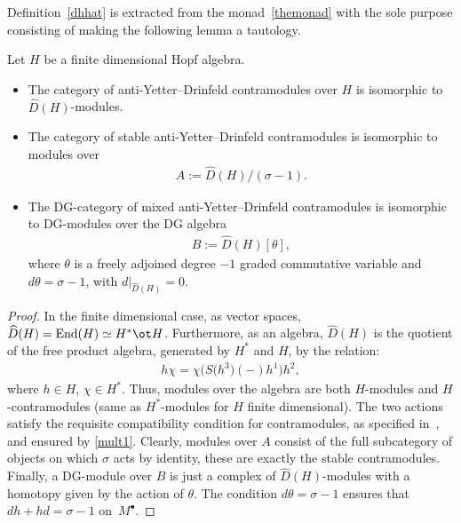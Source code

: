 Definition~\ref{dhhat} is extracted from the monad~\eqref{themonad} with the sole purpose consisting of making the following lemma a tautology.

\begin{Lemma}\label{bas}
Let $H$ be a finite dimensional Hopf algebra.
\begin{itemize}\itemsep=0pt
\item The category of anti-Yetter--Drinfeld contramodules over $H$ is isomorphic to $\widehat{D}(H)$-mo\-dules.

\item The category of stable anti-Yetter--Drinfeld contramodules is isomorphic to modules over
\begin{gather}
A:=\widehat{D}(H)/(\sigma-1).
\end{gather}

\item The DG-category of mixed anti-Yetter--Drinfeld contramodules is isomorphic to DG-mo\-dules over the DG algebra
\begin{gather}
B:=\widehat{D}(H)[\theta],
\end{gather}
where $\theta$ is a freely adjoined degree $-1$ graded commutative variable and $d\theta=\sigma-1$, with $d|_{\widehat{D}(H)}=0$.
\end{itemize}
\end{Lemma}
\begin{proof}
In the finite dimensional case, as vector spaces, $\widehat{D}(H)={\rm End}(H)\simeq H^*\ot H$. Furthermore, as an algebra, $\widehat{D}(H)$ is the quotient of the free product algebra, generated by $H^*$ and $H$, by the relation:
\begin{gather}
\label{mult1}
h \chi= \chi\big(S\big(h^3\big)(-)h^1\big)h^2,
\end{gather}
where $h\in H$, $\chi\in H^*$. Thus, modules over the algebra are both $H$-modules and $H$-cont\-ra\-mo\-du\-les (same as $H^*$-modules for $H$ finite dimensional). The two actions satisfy the requisite compatibility condition for contramodules, as specified in~\cite{contra}, and ensured by \eqref{mult1}. Clearly, modules over $A$ consist of the full subcategory of objects on which $\sigma$ acts by identity, these are exactly the stable contramodules. Finally, a DG-module over $B$ is just a complex of $\widehat{D}(H)$-modules with a homotopy given by the action of $\theta$. The condition $d\theta=\sigma-1$ ensures that $dh+hd=\sigma-1$ on~$M^\bullet$.
\end{proof}

